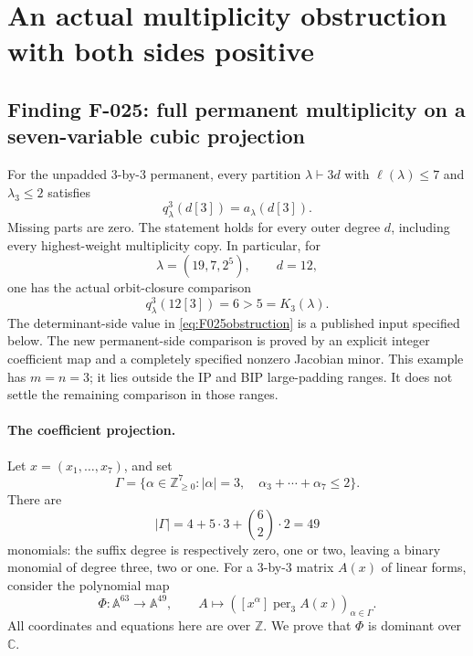 \section{An actual multiplicity obstruction with both sides positive}

\subsection*{Finding F-025: full permanent multiplicity on a seven-variable cubic projection}
For the unpadded \(3\)-by-\(3\) permanent, every partition
\(\lambda\vdash3d\) with \(\ell(\lambda)\leq7\)
and \(\lambda_3\leq2\) satisfies
\begin{equation}\label{eq:F025full}
                         q^3_\lambda(d[3])=a_\lambda(d[3]).
\end{equation}
Missing parts are zero. The statement holds for every outer
degree \(d\), including every highest-weight multiplicity
copy. In particular, for
\[
                        \lambda=(19,7,2^5),\qquad d=12,
                                                               \tag{F-025.1}
\]
one has the actual orbit-closure comparison
\begin{equation}\label{eq:F025obstruction}
                  q^3_\lambda(12[3])=6>5=K_3(\lambda).
\end{equation}
The determinant-side value in \eqref{eq:F025obstruction}
is a published input specified below. The new permanent-side
comparison is proved by an explicit integer coefficient map
and a completely specified nonzero Jacobian minor.
This example has \(m=n=3\); it lies outside the IP and
BIP large-padding ranges. It does not settle the remaining
comparison in those ranges.

\paragraph{The coefficient projection.}
Let \(x=(x_1,\ldots,x_7)\), and set
\[
 \Gamma=\{\alpha\in\mathbb Z_{\geq0}^7:
           |\alpha|=3,\quad\alpha_3+\cdots+\alpha_7\leq2\}.
                                                               \tag{F-025.2}
\]
There are
\[
               |\Gamma|=4+5\cdot3+\binom62\cdot2=49
\]
monomials: the suffix degree is respectively zero, one or
two, leaving a binary monomial of degree three, two or one.
For a \(3\)-by-\(3\) matrix \(A(x)\) of linear forms,
consider the polynomial map
\[
 \Phi:\mathbb A^{63}\longrightarrow\mathbb A^{49},
 \qquad A\longmapsto
        ([x^\alpha]\operatorname{per}_3 A(x))_{\alpha\in\Gamma}.
                                                               \tag{F-025.3}
\]
All coordinates and equations here are over \(\mathbb Z\).
We prove that \(\Phi\) is dominant over \(\mathbb C\).


